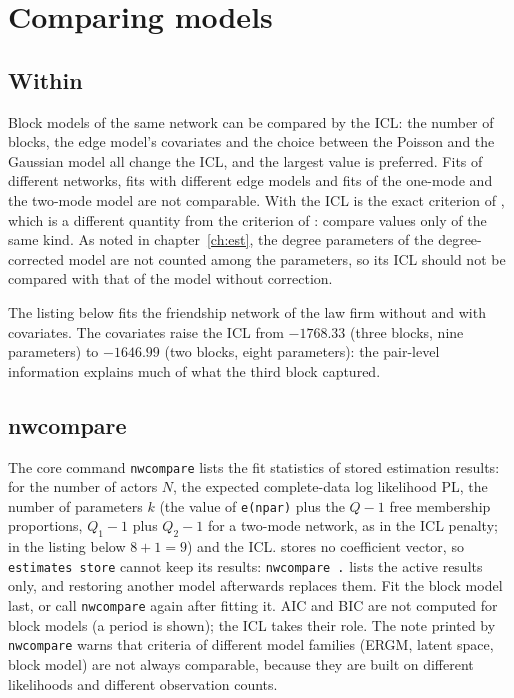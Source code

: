 \chapter{Comparing models}\label{ch:compare}

\section{Within \nwsbm{}}
Block models of the same network can be compared by the ICL: the number of blocks, the edge model's covariates and the choice between the Poisson and the Gaussian model all change the ICL, and the largest value is preferred. Fits of different networks, fits with different edge models and fits of the one-mode and the two-mode model are not comparable. With  the ICL is the exact criterion of \greed{}, which is a different quantity from the criterion of \blockmodels{}: compare values only of the same kind. As noted in chapter~\ref{ch:est}, the degree parameters of the degree-corrected model are not counted among the parameters, so its ICL should not be compared with that of the model without correction.

The listing below fits the friendship network of the law firm without and with covariates. The covariates raise the ICL from $-1768.33$ (three blocks, nine parameters) to $-1646.99$ (two blocks, eight parameters): the pair-level information explains much of what the third block captured.

\section{nwcompare}
The core command \texttt{nwcompare} lists the fit statistics of stored estimation results: for \nwsbm{} the number of actors $N$, the expected complete-data log likelihood PL, the number of parameters $k$ (the value of \texttt{e(npar)} plus the $Q-1$ free membership proportions, $Q_1-1$ plus $Q_2-1$ for a two-mode network, as in the ICL penalty; in the listing below $8+1=9$) and the ICL. \nwsbm{} stores no coefficient vector, so \texttt{estimates store} cannot keep its results: \texttt{nwcompare .} lists the active results only, and restoring another model afterwards replaces them. Fit the block model last, or call \texttt{nwcompare} again after fitting it. AIC and BIC are not computed for block models (a period is shown); the ICL takes their role. The note printed by \texttt{nwcompare} warns that criteria of different model families (ERGM, latent space, block model) are not always comparable, because they are built on different likelihoods and different observation counts.
